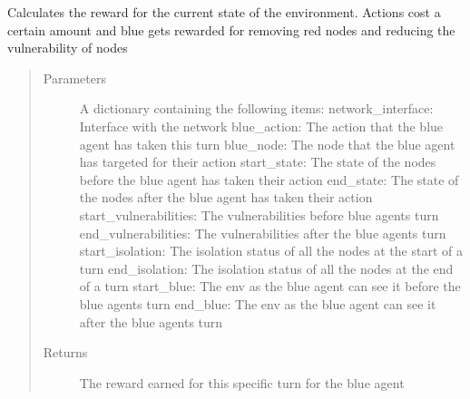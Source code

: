 \documentclass[letterpaper,10pt,english]{sphinxmanual}
\begin{document}
\begin{fulllineitems}
\label{\detokenize{source/yawning_titan.envs.generic.core:yawning_titan.envs.generic.core.reward_functions.standard_rewards}}
\sphinxAtStartPar
Calculates the reward for the current state of the environment. Actions cost a certain amount and blue gets rewarded
for removing red nodes and reducing the vulnerability of nodes
\begin{quote}\begin{description}
\item[{Parameters}] \leavevmode
\sphinxAtStartPar
{} \textendash{} A dictionary containing the following items:
network\_interface: Interface with the network
blue\_action: The action that the blue agent has taken this turn
blue\_node: The node that the blue agent has targeted for their action
start\_state: The state of the nodes before the blue agent has taken their action
end\_state: The state of the nodes after the blue agent has taken their action
start\_vulnerabilities: The vulnerabilities before blue agents turn
end\_vulnerabilities: The vulnerabilities after the blue agents turn
start\_isolation: The isolation status of all the nodes at the start of a turn
end\_isolation: The isolation status of all the nodes at the end of a turn
start\_blue: The env as the blue agent can see it before the blue agents turn
end\_blue: The env as the blue agent can see it after the blue agents turn

\item[{Returns}] \leavevmode
\sphinxAtStartPar
The reward earned for this specific turn for the blue agent

\end{description}\end{quote}

\end{fulllineitems}

\end{document}
